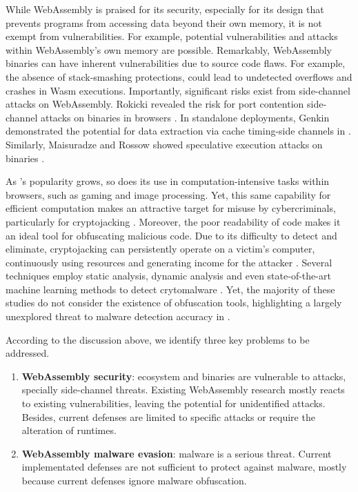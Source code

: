 While WebAssembly is praised for its security, especially for its design that prevents programs from accessing data beyond their own memory, it is not exempt from vulnerabilities. 
For example, potential vulnerabilities and attacks within WebAssembly's own memory \cite{usenixWasm2020} are possible.
Remarkably, WebAssembly binaries can have inherent vulnerabilities due to source code flaws. 
For example, the absence of stack-smashing protections, could lead to undetected overflows and crashes in Wasm executions\cite{DeRoover2022}.
Importantly, significant risks exist from side-channel attacks on WebAssembly.
Rokicki \etal revealed the risk for port contention side-channel attacks on \Wasm binaries in browsers \cite{10.1145/3488932.3517411}. 
In standalone deployments, Genkin \etal demonstrated the potential for data extraction via cache timing-side channels in \Wasm \cite{Genkin2018DrivebyKC}. 
Similarly, Maisuradze and Rossow showed speculative execution attacks on \Wasm binaries \cite{ret2spec}. 

As \Wasm's popularity grows, so does its use in computation-intensive tasks within browsers, such as gaming and image processing.
Yet, this same capability for efficient computation makes \Wasm an attractive target for misuse by cybercriminals, particularly for cryptojacking \cite{10.1145/3339252.3339261}.
Moreover, the poor readability of \Wasm code makes it an ideal tool for obfuscating malicious code.
Due to its difficulty to detect and eliminate, cryptojacking can persistently operate on a victim's computer, continuously using resources and generating income for the attacker \cite{9566204}.
Several techniques employ static analysis, dynamic analysis and even state-of-the-art machine learning methods to detect \Wasm crytomalware \cite{Minesweeper,MinerRay,MINOS,SEISMIC,RAPID,Outguard}.
Yet, the majority of these studies do not consider the existence of obfuscation tools, highlighting a largely unexplored threat to malware detection accuracy in \Wasm.




According to the discussion above, we identify three key problems to be addressed.

\begin{enumerate}[label=\textbf{Ps\arabic*}, ref=C\arabic*]

	\item \label{prob4} \textbf{WebAssembly security}: \Wasm ecosystem and binaries are vulnerable to attacks, specially side-channel threats. Existing WebAssembly research mostly reacts to existing vulnerabilities, leaving the potential for unidentified attacks.
	Besides, current defenses are limited to specific attacks or require the alteration of runtimes. 
	
	 
	\item \label{prob5} \textbf{WebAssembly malware evasion}: \Wasm malware is a serious threat. Current implementated defenses are not sufficient to protect against \Wasm malware, mostly because current defenses ignore malware obfuscation.

\end{enumerate}


